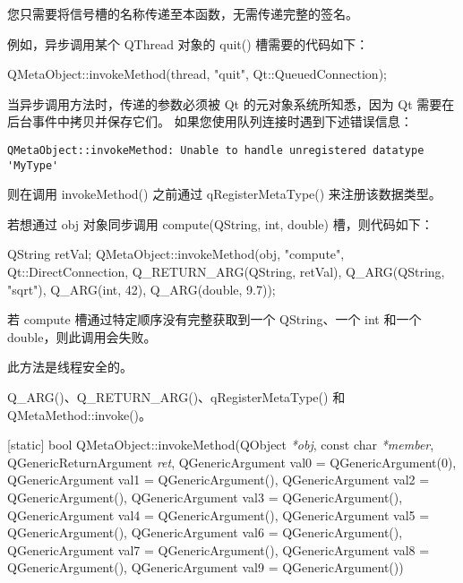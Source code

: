 您只需要将信号槽的名称传递至本函数，无需传递完整的签名。

例如，异步调用某个 QThread 对象的 quit() 槽需要的代码如下：

\begin{cppcode}
QMetaObject::invokeMethod(thread, "quit",
                           Qt::QueuedConnection);
\end{cppcode}

当异步调用方法时，传递的参数必须被 Qt 的元对象系统所知悉，因为 Qt 需要在后台事件中拷贝并保存它们。
如果您使用队列连接时遇到下述错误信息：

\begin{lstlisting}
QMetaObject::invokeMethod: Unable to handle unregistered datatype 'MyType'
\end{lstlisting}

则在调用 invokeMethod() 之前通过 qRegisterMetaType() 来注册该数据类型。

若想通过 obj 对象同步调用 compute(QString, int, double) 槽，则代码如下：

\begin{cppcode}
 QString retVal;
 QMetaObject::invokeMethod(obj, "compute", Qt::DirectConnection,
                           Q_RETURN_ARG(QString, retVal),
                           Q_ARG(QString, "sqrt"),
                           Q_ARG(int, 42),
                           Q_ARG(double, 9.7));
\end{cppcode}

若 compute 槽通过特定顺序没有完整获取到一个 QString、一个 int 和一个 double，则此调用会失败。

\begin{notice}
此方法是线程安全的。
\end{notice}

\begin{seeAlso}
Q\_ARG()、Q\_RETURN\_ARG()、qRegisterMetaType() 和 QMetaMethod::invoke()。
\end{seeAlso}


[static] bool QMetaObject::invokeMethod(QObject \emph{*obj}, const char \emph{*member}, QGenericReturnArgument \emph{ret}, 
QGenericArgument val0 = QGenericArgument(0), QGenericArgument val1 = QGenericArgument(), 
QGenericArgument val2 = QGenericArgument(), 
QGenericArgument val3 = QGenericArgument(), QGenericArgument val4 = QGenericArgument(), 
QGenericArgument val5 = QGenericArgument(), QGenericArgument val6 = QGenericArgument(), 
QGenericArgument val7 = QGenericArgument(), QGenericArgument val8 = QGenericArgument(), 
QGenericArgument val9 = QGenericArgument())

